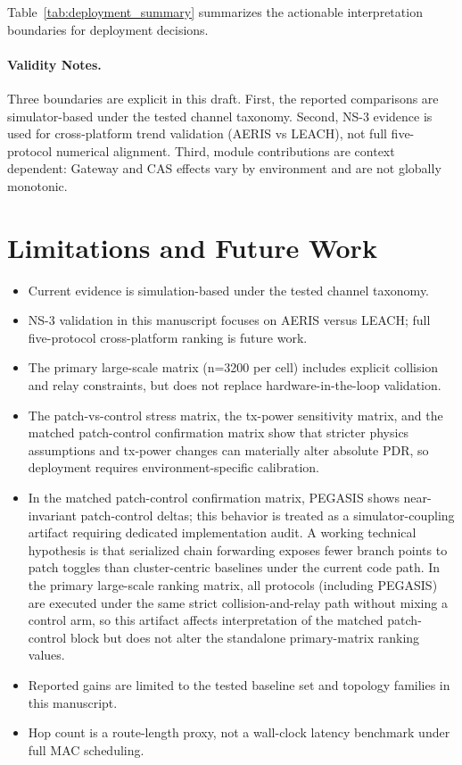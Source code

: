 ﻿\documentclass[sensors,article,submit,moreauthors,pdftex]{Definitions/mdpi}
\begin{document}
Table~\ref{tab:deployment_summary} summarizes the actionable interpretation boundaries for deployment decisions.

\paragraph{Validity Notes.}
Three boundaries are explicit in this draft. First, the reported comparisons are simulator-based under the tested channel taxonomy. Second, NS-3 evidence is used for cross-platform trend validation (AERIS vs LEACH), not full five-protocol numerical alignment. Third, module contributions are context dependent: Gateway and CAS effects vary by environment and are not globally monotonic.

\section{Limitations and Future Work}
\begin{itemize}
\item Current evidence is simulation-based under the tested channel taxonomy.
\item NS-3 validation in this manuscript focuses on AERIS versus LEACH; full five-protocol cross-platform ranking is future work.
\item The primary large-scale matrix (n=3200 per cell) includes explicit collision and relay constraints, but does not replace hardware-in-the-loop validation.
\item The patch-vs-control stress matrix, the tx-power sensitivity matrix, and the matched patch-control confirmation matrix show that stricter physics assumptions and tx-power changes can materially alter absolute PDR, so deployment requires environment-specific calibration.
\item In the matched patch-control confirmation matrix, PEGASIS shows near-invariant patch-control deltas; this behavior is treated as a simulator-coupling artifact requiring dedicated implementation audit. A working technical hypothesis is that serialized chain forwarding exposes fewer branch points to patch toggles than cluster-centric baselines under the current code path. In the primary large-scale ranking matrix, all protocols (including PEGASIS) are executed under the same strict collision-and-relay path without mixing a control arm, so this artifact affects interpretation of the matched patch-control block but does not alter the standalone primary-matrix ranking values.
\item Reported gains are limited to the tested baseline set and topology families in this manuscript.
\item Hop count is a route-length proxy, not a wall-clock latency benchmark under full MAC scheduling.
\end{itemize}
\end{document}
